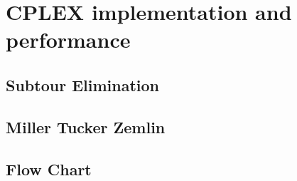 \chapter{CPLEX implementation and performance}

\section{Subtour Elimination}

\section{Miller Tucker Zemlin}

\section{Flow Chart}
